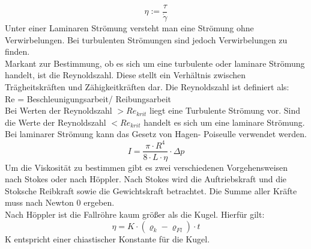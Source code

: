 \begin{equation}
\eta  := \frac{\tau }{ \dot{\gamma} }
\end{equation}
Unter einer Laminaren Strömung versteht man eine Strömung ohne Verwirbelungen. Bei turbulenten Strömungen sind jedoch Verwirbelungen zu finden.\\
Markant zur Bestimmung, ob es sich um eine turbulente oder laminare Strömung handelt, ist die Reynoldszahl. Diese stellt ein Verhältnis zwischen Trägheitskräften und Zähigkeitkräften dar. Die Reynoldszahl ist definiert als:\\
Re = Beschleunigungsarbeit/ Reibungsarbeit \\
Bei Werten der Reynoldszahl $> Re_{krit}$ liegt eine Turbulente Strömung vor. Sind die Werte der Reynoldszahl $< Re_{krit}$  handelt es sich um eine laminare Strömung.\\
Bei laminarer Strömung kann das Gesetz von Hagen- Poiseulle verwendet werden. \\
\begin{equation}
I = \frac{\pi \cdot R^4}{8\cdot L\cdot\eta} \cdot \Delta p
\end{equation}
Um die Viskosität zu bestimmen gibt es zwei verschiedenen Vorgehensweisen nach Stokes oder nach Höppler. Nach Stokes wird die Auftriebskraft und die Stoksche Reibkraft sowie die Gewichtskraft betrachtet. Die Summe aller Kräfte muss nach Newton 0 ergeben.\\
Nach Höppler ist die Fallröhre kaum größer als die Kugel. Hierfür gilt:\\
\begin{equation}
\eta= K\cdot ( \varrho_k - \varrho_{Fl})\cdot t 
\end{equation}
K entspricht einer chiastischer Konstante für die Kugel.




\pagebreak